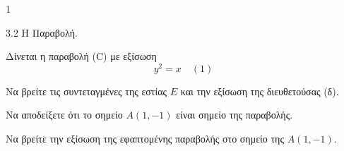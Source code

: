\begin{ylh}{1}
    \item 3.2 Η Παραβολή.
\end{ylh}
Δίνεται η παραβολή (C) με εξίσωση
\[ y^2 = x \quad (1) \]
\begin{alist}
\item Να βρείτε τις συντεταγμένες της εστίας $E$ και την εξίσωση της διευθετούσας (δ). 
\item Να αποδείξετε ότι το σημείο $A(1,-1)$ είναι σημείο της παραβολής. 
\item Να βρείτε την εξίσωση της εφαπτομένης παραβολής στο σημείο της $A(1,-1)$. 
\end{alist}